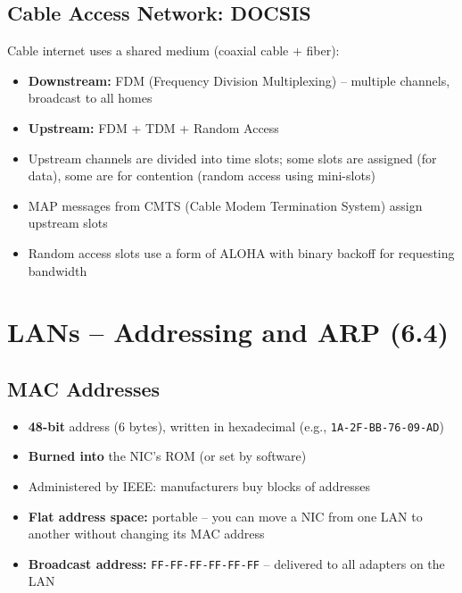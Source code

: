\subsection{Cable Access Network: DOCSIS}

\begin{keybox}
Cable internet uses a shared medium (coaxial cable + fiber):
\begin{itemize}[noitemsep]
    \item \textbf{Downstream:} FDM (Frequency Division Multiplexing) -- multiple channels, broadcast to all homes
    \item \textbf{Upstream:} FDM + TDM + Random Access
    \item Upstream channels are divided into time slots; some slots are assigned (for data), some are for contention (random access using mini-slots)
    \item MAP messages from CMTS (Cable Modem Termination System) assign upstream slots
    \item Random access slots use a form of ALOHA with binary backoff for requesting bandwidth
\end{itemize}
\end{keybox}

\section{LANs -- Addressing and ARP (6.4)}

\subsection{MAC Addresses}

\begin{keybox}
\begin{itemize}[noitemsep]
    \item \textbf{48-bit} address (6 bytes), written in hexadecimal (e.g., \texttt{1A-2F-BB-76-09-AD})
    \item \textbf{Burned into} the NIC's ROM (or set by software)
    \item Administered by IEEE: manufacturers buy blocks of addresses
    \item \textbf{Flat address space:} portable -- you can move a NIC from one LAN to another without changing its MAC address
    \item \textbf{Broadcast address:} \texttt{FF-FF-FF-FF-FF-FF} -- delivered to all adapters on the LAN
\end{itemize}
\end{keybox}

